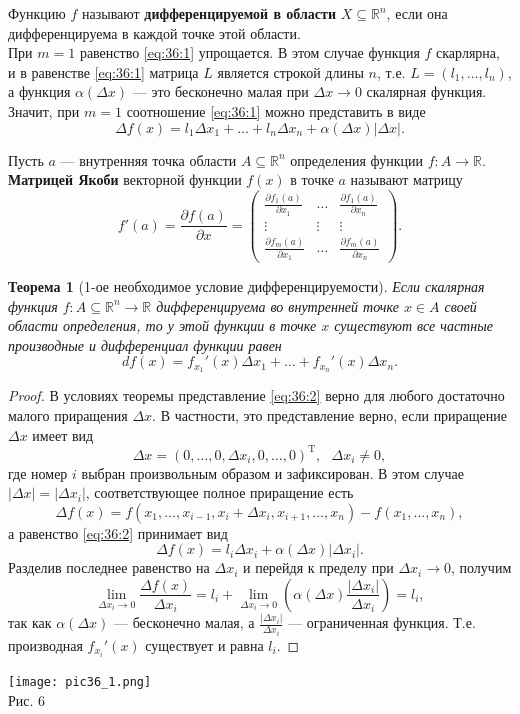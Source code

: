 \documentclass[12pt]{report}
\numberwithin{equation}{section}
\newtheorem{theorem}{Теорема}[section]
\begin{document}
Функцию $f$ называют \textbf{дифференцируемой в области} $X \subseteq \mathbb{R}^n$, если она дифференцируема в каждой точке этой области.\\

При $m = 1$ равенство \eqref{eq:36:1} упрощается. В этом случае функция $f$ скарлярна, и в равенстве \eqref{eq:36:1} матрица $L$ является строкой длины $n$, т.е. $L = (l_1, \ldots, l_n)$, а функция $\alpha(\Delta x)$ --- это бесконечно малая при $\Delta x \to 0$ скалярная функция. Значит, при $m = 1$ соотношение \eqref{eq:36:1} можно представить в виде
\begin{equation} \label{eq:36:2}
\Delta f(x) = l_1 \Delta x_1 + \dots + l_n \Delta x_n + \alpha(\Delta x) |\Delta x|.
\end{equation}

Пусть $a$ --- внутренняя точка области $A \subseteq \mathbb{R}^n$ определения функции $f : A \to \mathbb{R}$. \textbf{Матрицей Якоби} векторной функции $f(x)$ в точке $a$ называют матрицу
\[ f'(a) = \frac{\partial f(a)}{\partial x} = 
\begin{pmatrix}
\frac{\partial f_1(a)}{\partial x_1} & \dots & \frac{\partial f_1(a)}{\partial x_n}\\
\vdots & \vdots & \vdots\\
\frac{\partial f_m(a)}{\partial x_1} & \dots & \frac{\partial f_m(a)}{\partial x_n}
\end{pmatrix}.\]

\begin{theorem}[1-ое необходимое условие дифференцируемости] \label{th:36:1}
Если скалярная функция $f : A \subseteq \mathbb{R}^n \to \mathbb{R}$ дифференцируема во внутренней точке $x \in A$ своей области определения, то у этой функции в точке $x$ существуют все частные производные и дифференциал функции равен
\[ df(x) = f_{x_1}'(x) \Delta x_1 + \dots + f_{x_n}'(x) \Delta x_n.\]
\end{theorem}
\begin{proof}
В условиях теоремы представление \eqref{eq:36:2} верно для любого достаточно малого приращения $\Delta x$. В частности, это представление верно, если приращение $\Delta x$ имеет вид
\[ \Delta x = (0, \ldots, 0, \Delta x_i, 0, \ldots, 0)^{\mathrm{T}},~~~\Delta x_i \neq 0,\]
где номер $i$ выбран произвольным образом и зафиксирован. В этом случае $|\Delta x| = |\Delta x_i|$, соответствующее полное приращение есть
\[ \Delta f(x) = f(x_1, \ldots, x_{i-1}, x_i + \Delta x_i, x_{i + 1}, \ldots, x_n) - f(x_1, \ldots, x_n),\]
а равенство \eqref{eq:36:2} принимает вид
\[ \Delta f(x) = l_i \Delta x_i + \alpha (\Delta x) |\Delta x_i|.\]
Разделив последнее равенство на $\Delta x_i$ и перейдя к пределу при $\Delta x_i \to 0$, получим
\[ \lim_{\Delta x_i \to 0} \frac{\Delta f(x)}{\Delta x_i} = l_i + \lim_{\Delta x_i \to 0} \left( \alpha(\Delta x) \frac{|\Delta x_i|}{\Delta x_i} \right) = l_i,\]
так как $\alpha(\Delta x)$ --- бесконечно малая, а $\frac{|\Delta x_i|}{\Delta x_i}$ --- ограниченная функция. Т.е. производная $f_{x_i}'(x)$ существует и равна $l_i$.
\end{proof}
\begin{center}
\texttt{[image: pic36\_1.png]}\\ \label{pic:36:1}
Рис. 6
\end{center}
\end{document}
